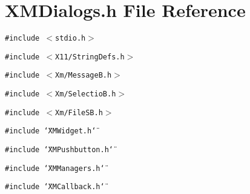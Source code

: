 \section{XMDialogs.h File Reference}
\label{XMDialogs_8h}
{\tt \#include $<$stdio.h$>$}\par
{\tt \#include $<$X11/String\-Defs.h$>$}\par
{\tt \#include $<$Xm/Message\-B.h$>$}\par
{\tt \#include $<$Xm/Selectio\-B.h$>$}\par
{\tt \#include $<$Xm/File\-SB.h$>$}\par
{\tt \#include \char`\"{}XMWidget.h\char`\"{}}\par
{\tt \#include \char`\"{}XMPushbutton.h\char`\"{}}\par
{\tt \#include \char`\"{}XMManagers.h\char`\"{}}\par
{\tt \#include \char`\"{}XMCallback.h\char`\"{}}\par
